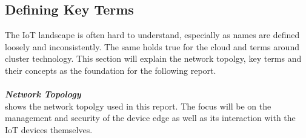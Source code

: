 \subsection{Defining Key Terms}
The IoT landscape is often hard to understand, especially as names are defined loosely and  inconsistently. The same holds true for the cloud and terms around cluster technology. This section will explain the network topolgy, key terms and their concepts as the foundation for the following report.\\

\vspace{0.5mm}\\
\textbf\textit{Network Topology}\\
 shows the network topolgy used in this report. The focus will be on the management and security of the device edge as well as its interaction with the IoT devices themselves. 

